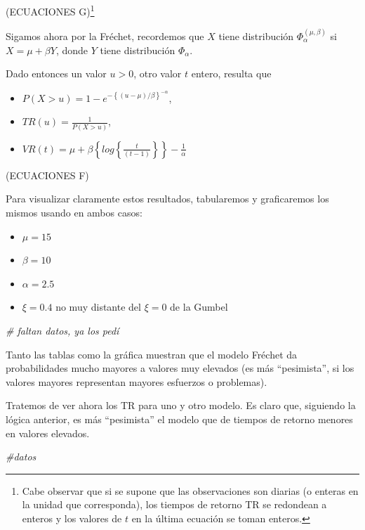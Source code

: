 \documentclass[
  oneside]{book}
\newenvironment{Shaded}{\begin{snugshade}}{\end{snugshade}}
\newcommand{\CommentTok}[1]{\textcolor[rgb]{0.56,0.35,0.01}{\textit{#1}}}
\begin{document}
(ECUACIONES
G)\footnote{Cabe observar que si se supone que las observaciones son diarias (o enteras en la unidad que corresponda), los tiempos de retorno TR se redondean a enteros y los valores de $t$ en la última ecuación se toman enteros.}

Sigamos ahora por la Fréchet, recordemos que \(X\) tiene distribución
\(\Phi_{\alpha}^{( \mu,\beta)}\) si \(X= \mu+\beta Y\), donde \(Y\)
tiene distribución \(\Phi_{\alpha}\).

Dado entonces un valor \(u>0\), otro valor \(t\) entero, resulta que

\begin{itemize}
\item $P(X>u)=1-e^{ -\left \{( u- \mu)/\beta\right \}^{-\alpha}}$,
\item $TR(u)=\frac{1}{P(X>u)}$,
\item $VR(t)= \mu+ \beta\left \{log\left \{ \frac{t}{(t-1)}\right \}\right \}-\frac{1}{\alpha}$
\end{itemize}

(ECUACIONES F)

Para visualizar claramente estos resultados, tabularemos y graficaremos
los mismos usando en ambos casos:

\begin{itemize}
\item $\mu=15$
\item $\beta=10$
\item $\alpha=2.5$
\item $\xi=0.4$ no muy distante del $\xi=0$ de la Gumbel
\end{itemize}

\begin{Shaded}
\begin{Highlighting}[]
\CommentTok{\# faltan datos, ya los pedí}
\end{Highlighting}
\end{Shaded}

Tanto las tablas como la gráfica muestran que el modelo Fréchet da
probabilidades mucho mayores a valores muy elevados (es más
``pesimista'', si los valores mayores representan mayores esfuerzos o
problemas).

Tratemos de ver ahora los TR para uno y otro modelo. Es claro que,
siguiendo la lógica anterior, es más ``pesimista'' el modelo que de
tiempos de retorno menores en valores elevados.

\begin{Shaded}
\begin{Highlighting}[]
\CommentTok{\#datos}
\end{Highlighting}
\end{Shaded}
\end{document}
